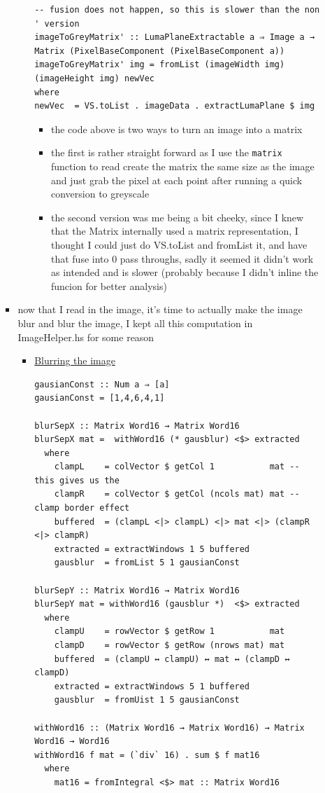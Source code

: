 \documentclass{article}
\begin{document}
\begin{enumerate}
\begin{enumerate}
\begin{itemize}
\begin{itemize}
\begin{verbatim}
-- fusion does not happen, so this is slower than the non ' version
imageToGreyMatrix' :: LumaPlaneExtractable a ⇒ Image a → Matrix (PixelBaseComponent (PixelBaseComponent a))
imageToGreyMatrix' img = fromList (imageWidth img) (imageHeight img) newVec
where
newVec  = VS.toList . imageData . extractLumaPlane $ img
\end{verbatim}
\begin{itemize}
\item the code above is two ways to turn an image into a matrix
\item the first is rather straight forward as Ι use the \texttt{matrix}
function to read create the matrix the same size as the image and
just grab the pixel at each point after running a quick
conversion to greyscale
\item the second version was me being a bit cheeky, since Ι knew
that the Matrix internally used a matrix representation, I
thought I could just do VS.toList and fromList it, and have that
fuse into 0 pass throughs, sadly it seemed it didn't work as
intended and is slower (probably because I didn't inline the
funcion for better analysis)
\end{itemize}
\end{itemize}
\item now that Ι read in the image, it's time to actually make the image
blur and blur the image, I kept all this computation in ImageHelper.hs
for some reason
\begin{itemize}
\item \uline{Blurring the image}
\begin{verbatim}
gausianConst :: Num a ⇒ [a]
gausianConst = [1,4,6,4,1]

blurSepX :: Matrix Word16 → Matrix Word16
blurSepX mat =  withWord16 (* gausblur) <$> extracted
  where
    clampL    = colVector $ getCol 1           mat -- this gives us the
    clampR    = colVector $ getCol (ncols mat) mat -- clamp border effect
    buffered  = (clampL <|> clampL) <|> mat <|> (clampR <|> clampR)
    extracted = extractWindows 1 5 buffered
    gausblur  = fromList 5 1 gausianConst

blurSepY :: Matrix Word16 → Matrix Word16
blurSepY mat = withWord16 (gausblur *)  <$> extracted
  where
    clampU    = rowVector $ getRow 1           mat
    clampD    = rowVector $ getRow (nrows mat) mat
    buffered  = (clampU ↔ clampU) ↔ mat ↔ (clampD ↔ clampD)
    extracted = extractWindows 5 1 buffered
    gausblur  = fromUist 1 5 gausianConst

withWord16 :: (Matrix Word16 → Matrix Word16) → Matrix Word16 → Word16
withWord16 f mat = (`div` 16) . sum $ f mat16
  where
    mat16 = fromIntegral <$> mat :: Matrix Word16


\end{verbatim}
\end{itemize}
\end{itemize}
\end{enumerate}
\end{enumerate}
\end{document}

